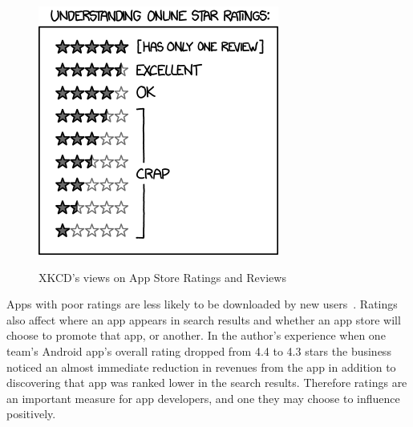 \begin{figure}[htbp!]
\begin{minipage}{.4\textwidth}
  \label{fig:xkcd-tornadoguard}
\end{minipage}\hfill%
\begin{minipage}{.5\textwidth}
  \centering
  \includegraphics[width=\textwidth]{images/xkcd/star_ratings.png}
  \label{fig:xkcd-star-ratings}
\end{minipage}
    \caption{XKCD's views on App Store Ratings and Reviews}
    \label{fig:xkcd-app-store-ratings}
\end{figure}

Apps with poor ratings are less likely to be downloaded by new users~\citep{dimensionalresearch2015_mobile_app_use_and_abandonment}. Ratings also affect where an app appears in search results and whether an app store will choose to promote that app, or another. In the author's experience when one team's Android app's overall rating dropped from 4.4 to 4.3 stars the business noticed an almost immediate reduction in revenues from the app in addition to discovering that app was ranked lower in the search results. Therefore ratings are an important measure for app developers, and one they may choose to influence positively. 

